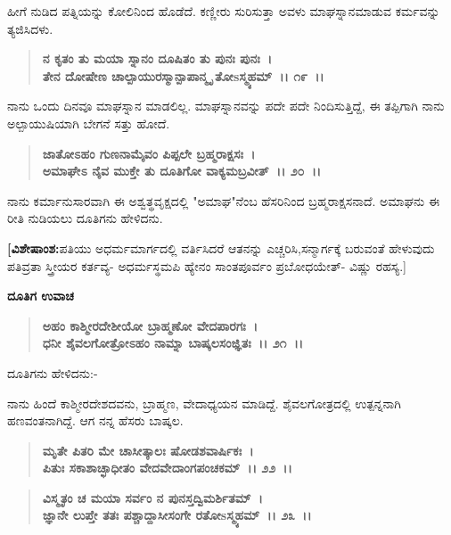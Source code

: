 ಹೀಗೆ ನುಡಿದ ಪತ್ನಿಯನ್ನು ಕೋಲಿನಿಂದ ಹೊಡೆದೆ. ಕಣ್ಣೀರು ಸುರಿಸುತ್ತಾ ಅವಳು ಮಾಘಸ್ನಾನಮಾಡುವ ಕರ್ಮವನ್ನು ತ್ಯಜಿಸಿದಳು.

\begin{verse}
\textbf{ನ ಕೃತಂ ತು ಮಯಾ ಸ್ನಾನಂ ದೂಷಿತಂ ತು ಪುನಃ ಪುನಃ~।}\\\textbf{ತೇನ ದೋಷೇಣ ಚಾಲ್ಪಾಯುರಸ್ಮಾನ್ಪಾಪಾನ್ಮೃ ತೋsಸ್ಮ್ಯಹಮ್~।। ೧೯~।।}
\end{verse}

ನಾನು ಒಂದು ದಿನವೂ ಮಾಘಸ್ನಾನ ಮಾಡಲಿಲ್ಲ. ಮಾಘಸ್ನಾನವನ್ನು ಪದೇ ಪದೇ ನಿಂದಿಸುತ್ತಿದ್ದೆ, ಈ ತಪ್ಪಿಗಾಗಿ ನಾನು ಅಲ್ಪಾಯುಷಿಯಾಗಿ ಬೇಗನೆ ಸತ್ತು ಹೋದೆ.

\begin{verse}
\textbf{ಜಾತೋಽಹಂ ಗುಣನಾಮೈವಂ ಪಿಪ್ಪಲೇ ಬ್ರಹ್ಮರಾಕ್ಷಸಃ~।}\\\textbf{ಅಮಾಘೇಽ ನೈವ ಮುಕ್ತೇ ತು ದೂತಿಗೋ ವಾಕ್ಯಮಬ್ರವೀತ್~।। ೨೦~।।}
\end{verse}

ನಾನು ಕರ್ಮಾನುಸಾರವಾಗಿ ಈ ಅಶ್ವತ್ಥವೃಕ್ಷದಲ್ಲಿ "ಅಮಾಘ"ನೆಂಬ ಹೆಸರಿನಿಂದ ಬ್ರಹ್ಮರಾಕ್ಷಸನಾದೆ. ಅಮಾಘನು ಈ ರೀತಿ ನುಡಿಯಲು ದೂತಿಗನು ಹೇಳಿದನು.

\textbf{[ವಿಶೇಷಾಂಶ:\enginline{-}}ಪತಿಯು ಅಧರ್ಮಮಾರ್ಗದಲ್ಲಿ ವರ್ತಿಸಿದರೆ ಆತನನ್ನು ಎಚ್ಚರಿಸಿ,\break ಸನ್ಮಾರ್ಗಕ್ಕೆ ಬರುವಂತೆ ಹೇಳುವುದು ಪತಿವ್ರತಾ ಸ್ತ್ರೀಯರ ಕರ್ತವ್ಯ- ಅಧರ್ಮಸ್ಥಮಪಿ ಹ್ಯೇನಂ ಸಾಂತಪೂರ್ವಂ ಪ್ರಬೋಧಯೇತ್- ವಿಷ್ಣು ರಹಸ್ಯ.]

\begin{flushleft}
\textbf{ದೂತಿಗ ಉವಾಚ\enginline{-}}
\end{flushleft}

\begin{verse}
\textbf{ಅಹಂ ಕಾಶ್ಮೀರದೇಶೀಯೋ ಬ್ರಾಹ್ಮಣೋ ವೇದಪಾರಗಃ~।}\\\textbf{ಧನೀ ಶೈವಲಗೋತ್ರೋಽಹಂ ನಾಮ್ನಾ ಬಾಷ್ಕಲಸಂಜ್ಞಿತಃ~।। ೨೧~।। }
\end{verse}

\begin{flushleft}
ದೂತಿಗನು ಹೇಳಿದನು:-
\end{flushleft}

ನಾನು ಹಿಂದೆ ಕಾಶ್ಮೀರದೇಶದವನು, ಬ್ರಾಹ್ಮಣ, ವೇದಾಧ್ಯಯನ ಮಾಡಿದ್ದೆ. ಶೈವಲಗೋತ್ರದಲ್ಲಿ ಉತ್ಪನ್ನನಾಗಿ ಹಣವಂತನಾಗಿದ್ದೆ. ಆಗ ನನ್ನ ಹೆಸರು ಬಾಷ್ಕಲ.

\begin{verse}
\textbf{ಮೃತೇ ಪಿತರಿ ಮೇ ಚಾಸೀತ್ಕಾಲಃ ಷೋಡಶವಾರ್ಷಿಕಃ~।}\\\textbf{ಪಿತುಃ ಸಕಾಶಾಚ್ಛಾಧೀತಂ ವೇದವೇದಾಂಗಪಂಚಕಮ್~।। ೨೨~।। }
\end{verse}

\begin{verse}
\textbf{ವಿಸ್ಮೃತಂ ಚ ಮಯಾ ಸರ್ವಂ ನ ಪುನಸ್ತದ್ವಿಮರ್ಶಿತಮ್~।}\\\textbf{ಜ್ಞಾನೇ ಲುಪ್ತೇ ತತಃ ಪಶ್ಚಾದ್ದಾಸೀಸಂಗೇ ರತೋsಸ್ಮ್ಯಹಮ್~।। ೨೩~।।}
\end{verse}

